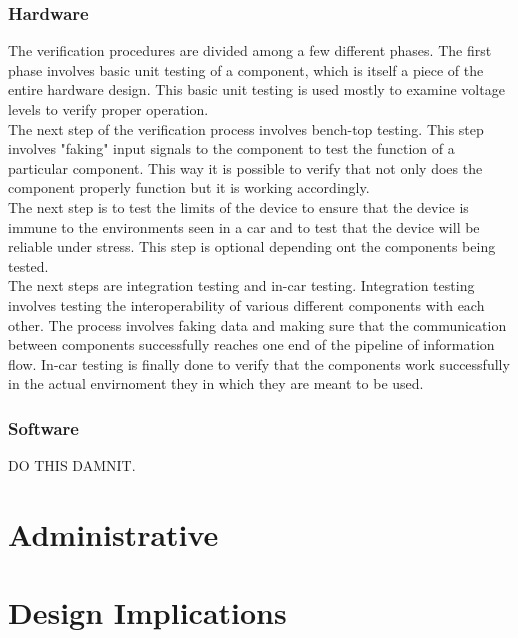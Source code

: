 \documentclass[12pt,letterpaper]{article}
\begin{document}
\subsubsection{Hardware}
The verification procedures are divided among a few different phases. The first phase involves basic unit testing of a component, which is itself a piece of the entire hardware design. This basic unit testing is used mostly to examine voltage levels to verify proper operation. \\

The next step of the verification process involves bench-top testing. This step involves "faking" input signals to the component to test the function of a particular component. This way it is possible to verify that not only does the component properly function but it is working accordingly. \\

The next step is to test the limits of the device to ensure that the device is immune to the environments seen in a car and to test that the device will be reliable under stress. This step is optional depending ont the components being tested. \\

The next steps are integration testing and in-car testing. Integration testing involves testing the interoperability of various different components with each other. The process involves faking data and making sure that the communication between components successfully reaches one end of the pipeline of information flow. In-car testing is finally done to verify that the components work successfully in the actual envirnoment they in which they are meant to be used.

\subsubsection{Software}
DO THIS DAMNIT.

\section{Administrative}


\section{Design Implications}
\end{document}
